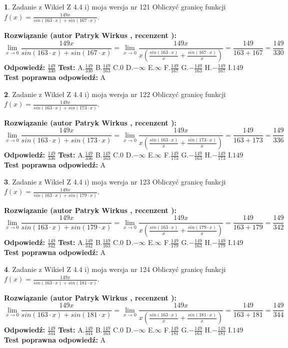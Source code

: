 \documentclass[12pt, a4paper]{article}
\theoremstyle{definition} %
\newtheorem{zad}{}
\newcommand{\zadStart}[1]{\begin{zad}#1\newline}
\newcommand{\zadStop}{\end{zad}}
\newcommand{\rozwStart}[2]{\noindent \textbf{Rozwiązanie (autor #1 , recenzent #2): }\newline}
\newcommand{\rozwStop}{\newline}
\newcommand{\odpStart}{\noindent \textbf{Odpowiedź:}\newline}
\newcommand{\odpStop}{\newline}
\newcommand{\testStart}{\noindent \textbf{Test:}\newline}
\newcommand{\testStop}{\newline}
\newcommand{\kluczStart}{\noindent \textbf{Test poprawna odpowiedź:}\newline}
\newcommand{\kluczStop}{\newline}
\begin{document}
\zadStart{Zadanie z Wikieł Z 4.4 i) moja wersja nr 121}
Obliczyć granicę funkcji $f(x)=\frac{149x}{sin(163\cdot x) +sin(167\cdot x)}$.
\zadStop
\rozwStart{Patryk Wirkus}{}
$$\lim\limits_{x\to 0}\frac{149x}{sin(163\cdot x) +sin(167\cdot x)}=\lim\limits_{x\to 0}\frac{149x}{x(\frac{sin(163\cdot x)}{x}+\frac{sin(167\cdot x)}{x})}=\frac{149}{163+167} = \frac{149}{330}$$
\rozwStop
\odpStart
$\frac{149}{330}$
\odpStop
\testStart
A.$\frac{149}{330}$
B.$\frac{149}{163}$
C.$0$
D.$-\infty$
E.$\infty$
F.$\frac{149}{167}$
G.$-\frac{149}{163}$
H.$-\frac{149}{167}$
I.$149$
\testStop
\kluczStart
A
\kluczStop



\zadStart{Zadanie z Wikieł Z 4.4 i) moja wersja nr 122}
Obliczyć granicę funkcji $f(x)=\frac{149x}{sin(163\cdot x) +sin(173\cdot x)}$.
\zadStop
\rozwStart{Patryk Wirkus}{}
$$\lim\limits_{x\to 0}\frac{149x}{sin(163\cdot x) +sin(173\cdot x)}=\lim\limits_{x\to 0}\frac{149x}{x(\frac{sin(163\cdot x)}{x}+\frac{sin(173\cdot x)}{x})}=\frac{149}{163+173} = \frac{149}{336}$$
\rozwStop
\odpStart
$\frac{149}{336}$
\odpStop
\testStart
A.$\frac{149}{336}$
B.$\frac{149}{163}$
C.$0$
D.$-\infty$
E.$\infty$
F.$\frac{149}{173}$
G.$-\frac{149}{163}$
H.$-\frac{149}{173}$
I.$149$
\testStop
\kluczStart
A
\kluczStop



\zadStart{Zadanie z Wikieł Z 4.4 i) moja wersja nr 123}
Obliczyć granicę funkcji $f(x)=\frac{149x}{sin(163\cdot x) +sin(179\cdot x)}$.
\zadStop
\rozwStart{Patryk Wirkus}{}
$$\lim\limits_{x\to 0}\frac{149x}{sin(163\cdot x) +sin(179\cdot x)}=\lim\limits_{x\to 0}\frac{149x}{x(\frac{sin(163\cdot x)}{x}+\frac{sin(179\cdot x)}{x})}=\frac{149}{163+179} = \frac{149}{342}$$
\rozwStop
\odpStart
$\frac{149}{342}$
\odpStop
\testStart
A.$\frac{149}{342}$
B.$\frac{149}{163}$
C.$0$
D.$-\infty$
E.$\infty$
F.$\frac{149}{179}$
G.$-\frac{149}{163}$
H.$-\frac{149}{179}$
I.$149$
\testStop
\kluczStart
A
\kluczStop



\zadStart{Zadanie z Wikieł Z 4.4 i) moja wersja nr 124}
Obliczyć granicę funkcji $f(x)=\frac{149x}{sin(163\cdot x) +sin(181\cdot x)}$.
\zadStop
\rozwStart{Patryk Wirkus}{}
$$\lim\limits_{x\to 0}\frac{149x}{sin(163\cdot x) +sin(181\cdot x)}=\lim\limits_{x\to 0}\frac{149x}{x(\frac{sin(163\cdot x)}{x}+\frac{sin(181\cdot x)}{x})}=\frac{149}{163+181} = \frac{149}{344}$$
\rozwStop
\odpStart
$\frac{149}{344}$
\odpStop
\testStart
A.$\frac{149}{344}$
B.$\frac{149}{163}$
C.$0$
D.$-\infty$
E.$\infty$
F.$\frac{149}{181}$
G.$-\frac{149}{163}$
H.$-\frac{149}{181}$
I.$149$
\testStop
\kluczStart
A
\kluczStop
\end{document}
